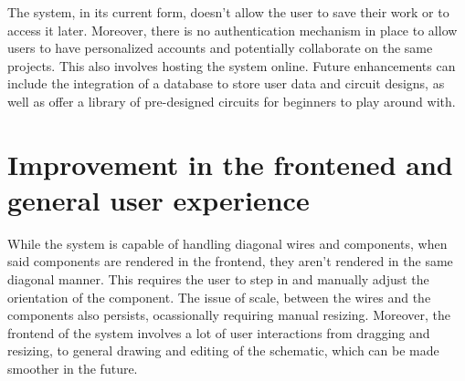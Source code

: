 The system, in its current form, doesn't allow the user to save their work or to access it later. Moreover, there is no authentication mechanism in place to allow users to have personalized accounts and potentially collaborate on the same projects. This also involves hosting the system online. Future enhancements can include the integration of a database to store user data and circuit designs, as well as offer a library of pre-designed circuits for beginners to play around with.

\section{Improvement in the frontened and general user experience}

While the system is capable of handling diagonal wires and components, when said components are rendered in the frontend, they aren't rendered in the same diagonal manner. This requires the user to step in and manually adjust the orientation of the component. The issue of scale, between the wires and the components also persists, ocassionally requiring manual resizing. Moreover, the frontend of the system involves a lot of user interactions from dragging and resizing, to general drawing and editing of the schematic, which can be made smoother in the future. 